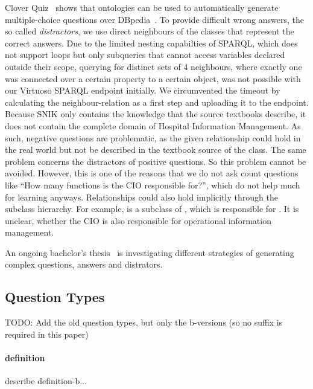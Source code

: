 \documentclass{IOS-Book-Article}     %
\newcommand{\citep}{\cite}%
\begin{document}
Clover Quiz~\citep{cloverquiz} shows that ontologies can be used to automatically generate multiple-choice questions over DBpedia~\citep{dbpedia}.
To provide difficult wrong answers, the so called \emph{distractors}, we use direct neighbours of the classes that represent the correct answers.
Due to the limited nesting capabilties of SPARQL, which does not support loops but only subqueries that cannot access variables declared outside their scope, querying for distinct sets of 4 neighbours, where exactly one was connected over a certain property to a certain object, was not possible with our Virtuoso SPARQL endpoint initially.
We circumvented the timeout by calculating the neighbour-relation as a first step and uploading it to the endpoint.
%
Because SNIK only contains the knowledge that the source textbooks describe, it does not contain the complete domain of Hospital Information Management.
As such, negative questions are problematic, as the given relationship could hold in the real world but not be described in the textbook source of the class.
The same problem concerns the distractors of positive questions.
So this problem cannot be avoided.
However, this is one of the reasons that we do not ask count questions like \enquote{How many functions is the CIO responsible for?}, which do not help much for learning anyways. %
Relationships could also hold implicitly through the subclass hierarchy.
For example,  is a subclass of , which is responsible for .
It is unclear, whether the CIO is also responsible for operational information management.

An ongoing bachelor's thesis~\citep{snikquiz} is investigating different strategies of generating complex questions, answers and distrators.

\subsection{Question Types}

TODO: Add the old question types, but only the b-versions (so no suffix is required in this paper)

\paragraph{definition}
describe definition-b...
\end{document}
